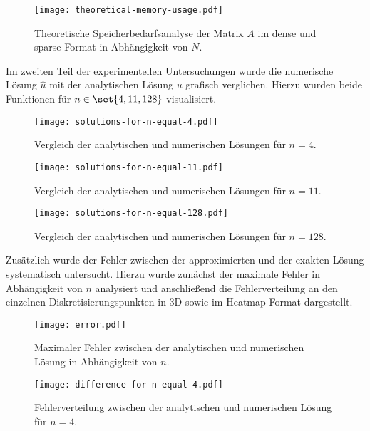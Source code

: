 \documentclass{scrartcl}
\begin{document}
\begin{figure}[H]\label{fig:theoretical-memory-usage}
    \centering
    \texttt{[image: theoretical-memory-usage.pdf]}
    \caption{
        Theoretische Speicherbedarfsanalyse der Matrix \(A\) im dense und sparse
        Format in Abhängigkeit von \(N\).
    }
\end{figure}

Im zweiten Teil der experimentellen Untersuchungen wurde die numerische Lösung
\(\hat u\) mit der analytischen Lösung \(u\) grafisch verglichen. Hierzu wurden
beide Funktionen für \(n \in \set{4, 11, 128}\) visualisiert.

\begin{figure}[H]\label{fig:solutions-for-n-equal-4}
    \centering
    \texttt{[image: solutions-for-n-equal-4.pdf]}
    \caption{Vergleich der analytischen und numerischen Lösungen für \(n = 4\).}
\end{figure}

\begin{figure}[H]\label{fig:solutions-for-n-equal-11}
    \centering
    \texttt{[image: solutions-for-n-equal-11.pdf]}
    \caption{Vergleich der analytischen und numerischen Lösungen für \(n = 11\).}
\end{figure}

\begin{figure}[H]\label{fig:solutions-for-n-equal-128}
    \centering
    \texttt{[image: solutions-for-n-equal-128.pdf]}
    \caption{Vergleich der analytischen und numerischen Lösungen für \(n = 128\).}
\end{figure}

Zusätzlich wurde der Fehler zwischen der approximierten und der exakten Lösung
systematisch untersucht. Hierzu wurde zunächst der maximale Fehler in
Abhängigkeit von \(n\) analysiert und anschließend die Fehlerverteilung an den
einzelnen Diskretisierungspunkten in 3D sowie im Heatmap-Format dargestellt.

\begin{figure}[H]\label{fig:error}
    \centering
    \texttt{[image: error.pdf]}
    \caption{
        Maximaler Fehler zwischen der analytischen und numerischen Lösung in
        Abhängigkeit von \(n\).
    }
\end{figure}

\begin{figure}[H]\label{fig:difference-for-n-equal-4}
    \centering
    \texttt{[image: difference-for-n-equal-4.pdf]}
    \caption{
        Fehlerverteilung zwischen der analytischen und numerischen Lösung für
        \(n = 4\).
    }
\end{figure}
\end{document}
